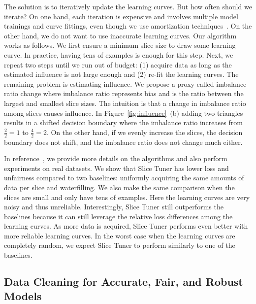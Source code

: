 \documentclass[11pt]{article}
\newcommand{\slicetuner}{Slice Tuner}
\begin{document}
The solution is to iteratively update the learning curves. But how often should we iterate? On one hand, each iteration is expensive and involves multiple model trainings and curve fittings, even though we use amortization techniques~\cite{DBLP:journals/corr/abs-2003-04549}. On the other hand, we do not want to use inaccurate learning curves. Our algorithm works as follows. We first ensure a minimum slice size to draw some learning curve. In practice, having tens of examples is enough for this step. Next, we repeat two steps until we run out of budget: (1) acquire data as long as the estimated influence is not large enough and (2) re-fit the learning curves. The remaining problem is estimating influence. We propose a proxy called imbalance ratio change where imbalance ratio represents bias and is the ratio between the largest and smallest slice sizes. The intuition is that a change in imbalance ratio among slices causes influence. In Figure~\ref{fig:influence}~(b) adding two triangles results in a shifted decision boundary where the imbalance ratio increases from $\frac{2}{2} = 1$ to $\frac{4}{2} = 2$. On the other hand, if we evenly increase the slices, the decision boundary does not shift, and the imbalance ratio does not change much either.

In reference~\cite{DBLP:journals/corr/abs-2003-04549}, we provide more details on the algorithms and also perform experiments on real datasets. 
We show that \slicetuner{} has lower loss and unfairness compared to two baselines: uniformly acquiring the same amounts of data per slice  and waterfilling. We also make the same comparison when the slices are small and only have tens of examples. Here the learning curves are very noisy and thus unreliable. Interestingly, \slicetuner{} still outperforms the baselines because it can still leverage the relative loss differences among the learning curves. As more data is acquired, \slicetuner{} performs even better with more reliable learning curves. In the worst case when the learning curves are completely random, we expect \slicetuner{} to perform similarly to one of the baselines.
 
 
\subsection{Data Cleaning for Accurate, Fair, and Robust Models}
\end{document}
